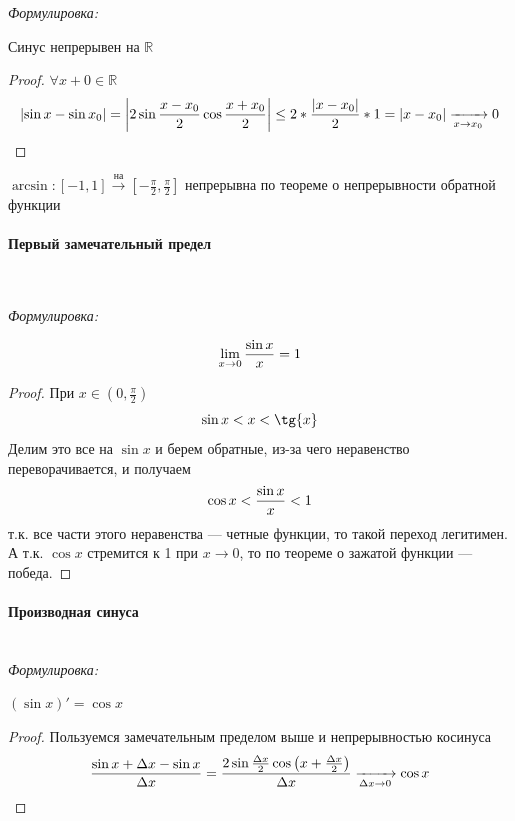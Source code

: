 \documentclass{article}
\let\vanillaparagraph\paragraph
\renewcommand{\paragraph}[1]{\vanillaparagraph{#1}\mbox{}\\}
\begin{document}
\textit{Формулировка: }

Синус непрерывен на $\mathbb{R}$

\begin{proof}
$\forall x+0 \in \mathbb{R}$
\begin{equation}
\left|\sin{x} - \sin{x_0}\right| = \left|2\sin{\frac{x - x_0} {2}} \cos{\frac{x + x_0} {2}}\right| \leq 2 *  \frac{|x - x_0|} {2} * 1 = |x - x_0| \xrightarrow[x\to x_0] {} 0\notag
\end{equation}
\end{proof}

$\arcsin{}: [-1, 1] \xrightarrow{\text{на}} \left[ -\frac{\pi}{2}, \frac{\pi}{2}\right]$ непрерывна по теореме о непрерывности обратной функции

\paragraph{Первый замечательный предел} \label{first_lim}

\textit{Формулировка: }

\begin{equation}
\lim_{x\to 0} \frac{\sin{ x}} {x} = 1 \notag
\end{equation}

\begin{proof}
При $x \in \left( 0, \frac{\pi}{2}\right)$
\begin{equation}
\sin{x} < x < \tg{x}\notag
\end{equation}
Делим это все на $\sin{x}$ и берем обратные, из-за чего неравенство переворачивается, и получаем
\begin{equation}
\cos{x} < \frac{\sin{x}}{x} < 1\notag
\end{equation}
т.к. все части этого неравенства --- четные функции, то такой переход легитимен. А т.к. $\cos{x}$ стремится к 1 при $ x\to 0$, то по теореме о зажатой функции --- победа.
\end{proof}

\paragraph{Производная синуса}

\textit{Формулировка: }

$(\sin{x})' = \cos{x}$

\begin{proof}
Пользуемся замечательным пределом выше и непрерывностью косинуса
\begin{equation}
\frac{\sin{x + \Delta x} - \sin{x}} {\Delta x} = \frac{2\sin{\frac{\Delta x} {2}} \cos{\left( x + \frac{\Delta x} {2} \right)}} {\Delta x} \xrightarrow[\Delta x \to 0] {} \cos{x} \notag
\end{equation}
\end{proof}
\newpage
\end{document}
